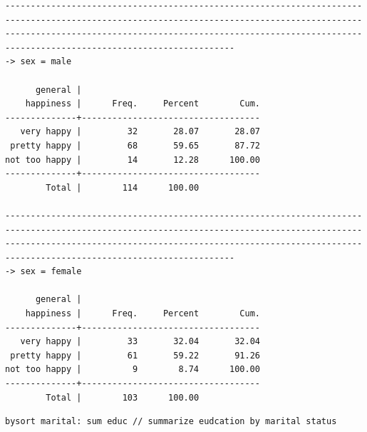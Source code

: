 \documentclass[]{book}
\begin{document}
\begin{verbatim}
---------------------------------------------------------------------------------------------------------------------------------------------------------------------------------------------------------------------------------------------------------------
-> sex = male

      general |
    happiness |      Freq.     Percent        Cum.
--------------+-----------------------------------
   very happy |         32       28.07       28.07
 pretty happy |         68       59.65       87.72
not too happy |         14       12.28      100.00
--------------+-----------------------------------
        Total |        114      100.00

---------------------------------------------------------------------------------------------------------------------------------------------------------------------------------------------------------------------------------------------------------------
-> sex = female

      general |
    happiness |      Freq.     Percent        Cum.
--------------+-----------------------------------
   very happy |         33       32.04       32.04
 pretty happy |         61       59.22       91.26
not too happy |          9        8.74      100.00
--------------+-----------------------------------
        Total |        103      100.00
\end{verbatim}

\begin{verbatim}
bysort marital: sum educ // summarize eudcation by marital status
\end{verbatim}
\end{document}

